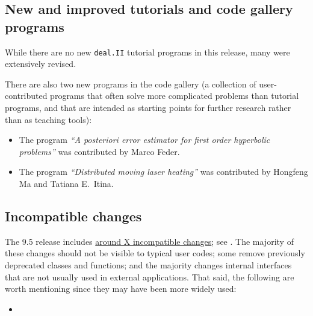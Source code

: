 \documentclass{ansarticle-preprint}
\newcommand{\specialword}[1]{\texttt{#1}}
\newcommand{\dealii}{{\specialword{deal.II}}\xspace}
\begin{document}


\subsection{New and improved tutorials and code gallery programs}
\label{subsec:steps}

While there are no new \dealii tutorial programs in this release, many
were extensively revised.

There are also two new programs in the code gallery (a collection of
user-contributed programs that often solve more complicated problems
than tutorial programs, and that are intended as starting points for further
research rather than as teaching tools):
\begin{itemize}
  \item The program \textit{``A posteriori error estimator for first order hyperbolic problems''}
  was contributed by Marco Feder.
  \item The program \textit{``Distributed moving laser heating''} was contributed by
  Hongfeng Ma and Tatiana E.~Itina.
\end{itemize}



\subsection{Incompatible changes}\label{subsec:deprecated}

The 9.5 release includes
\href{https://dealii.org/developer/doxygen/deal.II/changes_between_9_4_2_and_9_5_0.html}
{around X incompatible changes}; see \cite{changes95}. The majority of these changes
should not be visible to typical user codes; some remove previously
deprecated classes and functions; and the majority changes internal
interfaces that are not usually used in external
applications. That said, the following are worth mentioning since they
may have been more widely used:
\begin{itemize}
  \item 
{}
\end{itemize}
\end{document}
